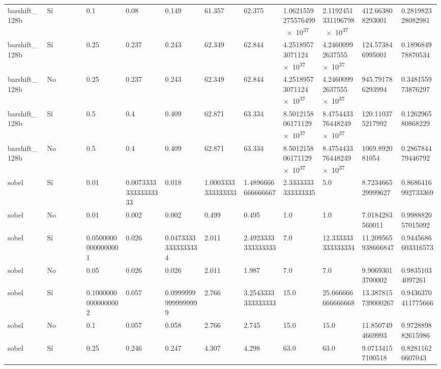 {{\begin{longtable}{M{0.09\linewidth}M{0.09\linewidth}M{0.09\linewidth}M{0.09\linewidth}M{0.09\linewidth}M{0.09\linewidth}M{0.09\linewidth}M{0.09\linewidth}M{0.09\linewidth}M{0.09\linewidth}M{0.09\linewidth}}
barshift\_128b & Sí & \num{0.1} & \num{0.08} & \num{0.149} & \num{61.357} & \num{62.375} & \num{1.0621559275576499e+37} & \num{2.1192451331196798e+37} & \num{412.663808293001} & \num{0.281982328082981} \\
barshift\_128b & Sí & \num{0.25} & \num{0.237} & \num{0.243} & \num{62.349} & \num{62.844} & \num{4.25189573071124e+37} & \num{4.24600992637555e+37} & \num{124.573846995001} & \num{0.189684978870534} \\
barshift\_128b & No & \num{0.25} & \num{0.237} & \num{0.243} & \num{62.349} & \num{62.844} & \num{4.25189573071124e+37} & \num{4.24600992637555e+37} & \num{945.791786293994} & \num{0.348155973876297} \\
barshift\_128b & Sí & \num{0.5} & \num{0.4} & \num{0.409} & \num{62.871} & \num{63.334} & \num{8.501215806171129e+37} & \num{8.475443376448249e+37} & \num{120.110375217992} & \num{0.126296580868229} \\
barshift\_128b & No & \num{0.5} & \num{0.4} & \num{0.409} & \num{62.871} & \num{63.334} & \num{8.501215806171129e+37} & \num{8.475443376448249e+37} & \num{1069.892081054} & \num{0.286784479446792} \\
sobel & Sí & \num{0.01} & \num{0.007333333333333333} & \num{0.018} & \num{1.0003333333333333} & \num{1.4896666666666667} & \num{2.3333333333333335} & \num{5.0} & \num{8.723466529999627} & \num{0.8686416992733369} \\
sobel & No & \num{0.01} & \num{0.002} & \num{0.002} & \num{0.499} & \num{0.495} & \num{1.0} & \num{1.0} & \num{7.0184283560011} & \num{0.998882057015092} \\
sobel & Sí & \num{0.05000000000000001} & \num{0.026} & \num{0.04733333333333334} & \num{2.011} & \num{2.4923333333333333} & \num{7.0} & \num{12.333333333333334} & \num{11.209565938666847} & \num{0.9445686603316573} \\
sobel & No & \num{0.05} & \num{0.026} & \num{0.026} & \num{2.011} & \num{1.987} & \num{7.0} & \num{7.0} & \num{9.90693013700002} & \num{0.98351034097261} \\
sobel & Sí & \num{0.10000000000000002} & \num{0.057} & \num{0.09999999999999999} & \num{2.766} & \num{3.2543333333333333} & \num{15.0} & \num{25.666666666666668} & \num{13.387815739000267} & \num{0.9436370411775666} \\
sobel & No & \num{0.1} & \num{0.057} & \num{0.058} & \num{2.766} & \num{2.745} & \num{15.0} & \num{15.0} & \num{11.8507494669993} & \num{0.972889882615986} \\
sobel & Sí & \num{0.25} & \num{0.246} & \num{0.247} & \num{4.307} & \num{4.298} & \num{63.0} & \num{63.0} & \num{9.07134157100518} & \num{0.82811626607043} \\

\end{longtable}}}
